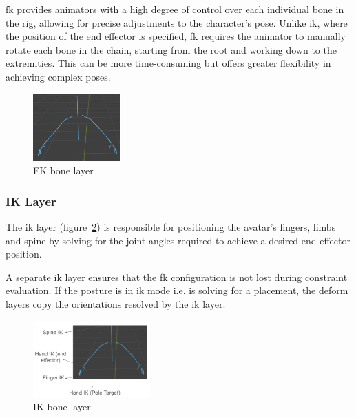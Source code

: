 \documentclass[../../main.tex]{subfiles}
\begin{document}
\gls{fk} provides animators with a high degree of control over each individual bone in the rig, allowing for precise adjustments to the character's pose. Unlike \gls{ik}, where the position of the end effector is specified, \gls{fk} requires the animator to manually rotate each bone in the chain, starting from the root and working down to the extremities. This can be more time-consuming but offers greater flexibility in achieving complex poses.

\begin{figure}[h]
    \centering
    \includegraphics[width=0.3\textwidth]{chapters/avatar_creation_pose_synthesis/images/fk_layer.png}
    \caption{FK bone layer}
    \label{fig:fk_layer}
\end{figure}

\subsubsection{IK Layer}
\label{ch:avatar_creation_pose_synthesis:proc_rig_signing_avatars:bone_layers:ik_layer}

The \gls{ik} layer (figure~\ref{fig:ik_layer}) is responsible for positioning the avatar's fingers, limbs and spine by solving for the joint angles required to achieve a desired end-effector position.

A separate \gls{ik} layer ensures that the \gls{fk} configuration is not lost during constraint evaluation. If the posture is in \gls{ik} mode i.e. is solving for a placement, the deform layers copy the orientations resolved by the \gls{ik} layer.

\begin{figure}[h]
    \centering
    \includegraphics[width=0.4\textwidth]{chapters/avatar_creation_pose_synthesis/images/ik_layer.png}
    \caption{IK bone layer}
    \label{fig:ik_layer}
\end{figure}
\end{document}
